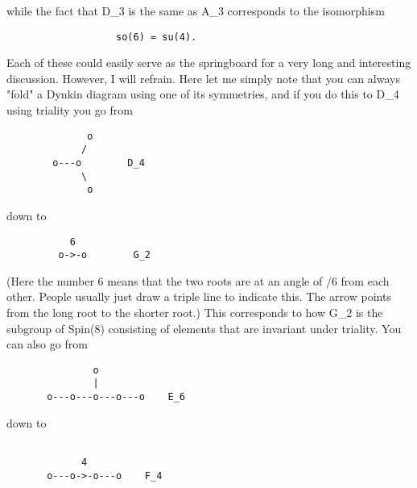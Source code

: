 while the fact that D_3 is the same as A_3 corresponds to the 
isomorphism
\begin{verbatim}
                   so(6) = su(4).
\end{verbatim}
    
Each of these could easily serve as the springboard for a very
long and interesting discussion.  However, I will refrain.  Here
let me simply note that you can always "fold" a Dynkin diagram using
one of its symmetries, and if you do this to D_4 using triality
you go from 
\begin{verbatim}
              o  
             /   
        o---o        D_4
             \   
              o  

\end{verbatim}
    
down to
\begin{verbatim}
           6
         o->-o        G_2
\end{verbatim}
    
(Here the number 6 means that the two roots are at an angle of
\pi /6 from each other.  People usually just draw a triple line
to indicate this.  The arrow points from the long root to the shorter
root.)  This corresponds to how G_2 is the subgroup of Spin(8) consisting 
of elements that are invariant under triality.  You can also go from
\begin{verbatim}
               o  
               |          
       o---o---o---o---o    E_6

\end{verbatim}
    
down to
\begin{verbatim}

             4
       o---o->-o---o    F_4

\end{verbatim}
    
